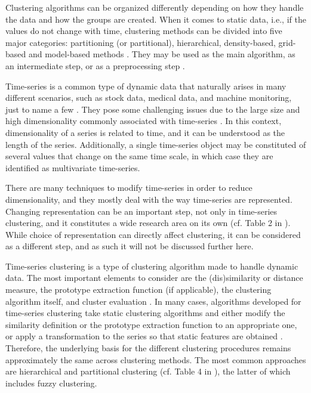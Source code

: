 Clustering algorithms can be organized differently depending on how they handle the data and how the groups are created.
When it comes to static data, i.e., if the values do not change with time,
clustering methods can be divided into five major categories:
partitioning (or partitional),
hierarchical,
density-based,
grid-based and
model-based methods \citep{liao2005, rani2012}.
They may be used as the main algorithm,
as an intermediate step,
or as a preprocessing step \citep{aghabozorgi2015}.

Time-series is a common type of dynamic data that naturally arises in many different scenarios,
such as stock data,
medical data,
and machine monitoring,
just to name a few \citep{aghabozorgi2015, aggarwal2013}.
They pose some challenging issues due to the large size and high dimensionality commonly associated with time-series \citep{aghabozorgi2015}.
In this context,
dimensionality of a series is related to time,
and it can be understood as the length of the series.
Additionally, a single time-series object may be constituted of several values that change on the same time scale,
in which case they are identified as multivariate time-series.

There are many techniques to modify time-series in order to reduce dimensionality,
and they mostly deal with the way time-series are represented.
Changing representation can be an important step,
not only in time-series clustering,
and it constitutes a wide research area on its own (cf. Table 2 in \citet{aghabozorgi2015}).
While choice of representation can directly affect clustering,
it can be considered as a different step,
and as such it will not be discussed further here.

Time-series clustering is a type of clustering algorithm made to handle dynamic data.
The most important elements to consider are the (dis)similarity or distance measure,
the prototype extraction function (if applicable),
the clustering algorithm itself,
and cluster evaluation \citep{aghabozorgi2015}.
In many cases,
algorithms developed for time-series clustering take static clustering algorithms and either modify the similarity definition or the prototype extraction function to an appropriate one,
or apply a transformation to the series so that static features are obtained \citep{liao2005}.
Therefore, the underlying basis for the different clustering procedures remains approximately the same across clustering methods.
The most common approaches are hierarchical and partitional clustering (cf. Table 4 in \citet{aghabozorgi2015}),
the latter of which includes fuzzy clustering.

